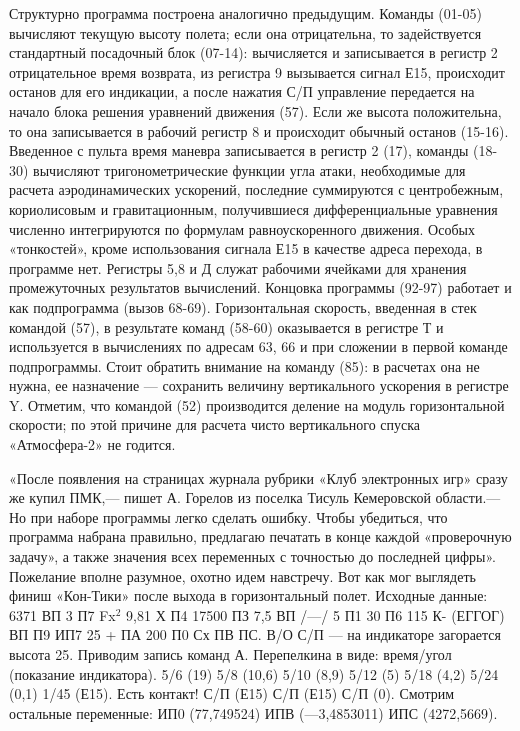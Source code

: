 \documentclass[11pt,a4paper,oneside]{article}
\begin{document}
Структурно программа построена аналогично предыдущим. Команды (01-05) вычисляют текущую высоту полета; если она отрицательна, то задействуется стандартный посадочный блок (07-14): вычисляется и записывается в регистр 2 отрицательное время возврата, из регистра 9 вызывается сигнал Е15, происходит останов для его индикации, а после нажатия С/П управление передается на начало блока решения уравнений движения (57). Если же высота положительна, то она записывается в рабочий регистр 8 и происходит обычный останов (15-16). Введенное с пульта время маневра записывается в регистр 2 (17), команды (18-30) вычисляют тригонометрические функции угла атаки, необходимые для расчета аэродинамических ускорений, последние суммируются с центробежным, кориолисовым и гравитационным, получившиеся дифференциальные уравнения численно интегрируются по формулам равноускоренного движения. Особых «тонкостей», кроме использования сигнала Е15 в качестве адреса перехода, в программе нет. Регистры 5,8 и Д служат рабочими ячейками для хранения промежуточных результатов вычислений. Концовка программы (92-97) работает и как подпрограмма (вызов 68-69). Горизонтальная скорость, введенная в стек командой (57), в результате команд (58-60) оказывается в регистре Т и используется в вычислениях по адресам 63, 66 и при сложении в первой команде подпрограммы. Стоит обратить внимание на команду (85): в расчетах она не нужна, ее назначение — сохранить величину вертикального ускорения в регистре Y. Отметим, что командой (52) производится деление на модуль горизонтальной скорости; по этой причине для расчета чисто вертикального спуска «Атмосфера-2» не годится.

«После появления на страницах журнала рубрики «Клуб электронных игр» сразу же купил ПМК,— пишет А. Горелов из поселка Тисуль Кемеровской области.— Но при наборе программы легко сделать ошибку. Чтобы убедиться, что программа набрана правильно, предлагаю печатать в конце каждой «проверочную задачу», а также значения всех переменных с точностью до последней цифры». Пожелание вполне разумное, охотно идем навстречу. Вот как мог выглядеть финиш «Кон-Тики» после выхода в горизонтальный полет. Исходные данные: 6371 ВП 3 П7 Fx$^{2}$ 9,81 Х П4 17500 ПЗ 7,5 ВП /—/ 5 П1 30 П6 115 К- (ЕГГОГ) ВП П9 ИП7 25 + ПА 200 П0 Сх ПВ ПС. В/О С/П — на индикаторе загорается высота 25. Приводим запись команд А. Перепелкина в виде: время/угол (показание индикатора). 5/6 (19) 5/8 (10,6) 5/10 (8,9) 5/12 (5) 5/18 (4,2) 5/24 (0,1) 1/45 (Е15). Есть контакт! С/П (Е15) С/П (Е15) С/П (0). Смотрим остальные переменные: ИП0 (77,749524) ИПВ (—3,4853011) ИПС (4272,5669).
\end{document}
